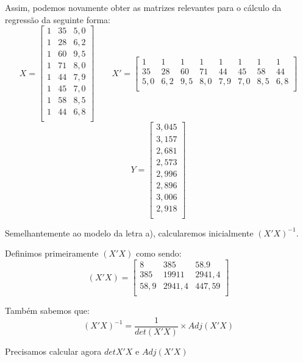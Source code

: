 \documentclass[]{ufpe-exercises}
\begin{document}
\begin{questions}
\begin{parts}
\begin{solution}
			\vspace{0.2cm}

			Assim, podemos novamente obter as matrizes relevantes para o cálculo da regressão da seguinte forma:
			\[ X =
				\begin{bmatrix}
					1 & 35 & 5,0 \\
					1 & 28 & 6,2 \\
					1 & 60 & 9,5 \\
					1 & 71 & 8,0 \\
					1 & 44 & 7,9 \\
					1 & 45 & 7,0 \\
					1 & 58 & 8,5 \\
					1 & 44 & 6,8 \\
				\end{bmatrix} \qquad
				X' =
				\begin{bmatrix}
					1   & 1   & 1   & 1   & 1   & 1   & 1   & 1   \\
					35  & 28  & 60  & 71  & 44  & 45  & 58  & 44  \\
					5,0 & 6,2 & 9,5 & 8,0 & 7,9 & 7,0 & 8,5 & 6,8 \\
				\end{bmatrix}
			\]
			\[
				Y =
				\begin{bmatrix}
					3,045 \\
					3,157 \\
					2,681 \\
					2,573 \\
					2,996 \\
					2,896 \\
					3,006 \\
					2,918 \\
				\end{bmatrix}
			\]

			Semelhantemente ao modelo da letra a), calcularemos inicialmente \((X'X)^{-1}\).

			Definimos primeiramente \((X'X)\) como sendo:
			\[ (X'X) =
				\begin{bmatrix}
					8    & 385    & 58.9   \\
					385  & 19911  & 2941,4 \\
					58,9 & 2941,4 & 447,59 \\
				\end{bmatrix}
			\]

			Também sabemos que:
			\[
				(X'X)^{-1} = \frac{1}{det(X'X)} \times Adj(X'X)
			\]

			Precisamos calcular agora \(det{X'X}\) e \(Adj(X'X)\)


\end{solution}
\end{parts}
\end{questions}
\end{document}

